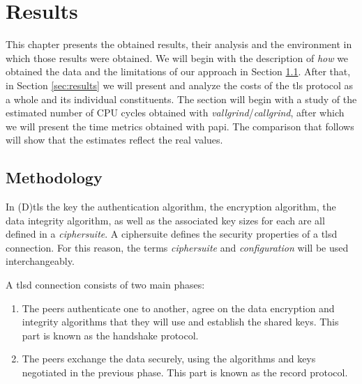 
\chapter{Results}
\label{chapter:results}

This chapter presents the obtained results, their analysis and the environment in which those results were obtained.
We will begin with the description of \textit{how} we obtained the data and the limitations of our approach in Section
\ref{sec:methodology}. After that, in Section \ref{sec:results} we will present and analyze the costs of the \gls{tls} protocol as a whole 
and its individual constituents. The section will begin with a study of the estimated number of CPU cycles obtained with \textit{vallgrind}/\textit{callgrind},
after which we will present the time metrics obtained with \gls{papi}. The comparison that follows will show that the estimates
reflect the real values.

\section{Methodology} \label{sec:methodology}

In (D)\gls{tls} the key the authentication algorithm, the encryption algorithm, the
data integrity algorithm, as well as the associated key sizes for each are all defined in a \textit{ciphersuite}.
A ciphersuite defines the security properties of a \acrshort{tlsd} connection. For this reason, the terms
\textit{ciphersuite} and \textit{configuration} will be used interchangeably.

A \gls{tlsd} connection consists of two main phases:
\begin{enumerate}
  \item The peers authenticate one to another, agree on the data encryption and integrity
  algorithms that they will use and establish the shared keys. This part is known as the handshake protocol.
 \item The peers exchange the data securely, using the algorithms and keys negotiated in
the previous phase. This part is known as the record protocol.
\end{enumerate}

